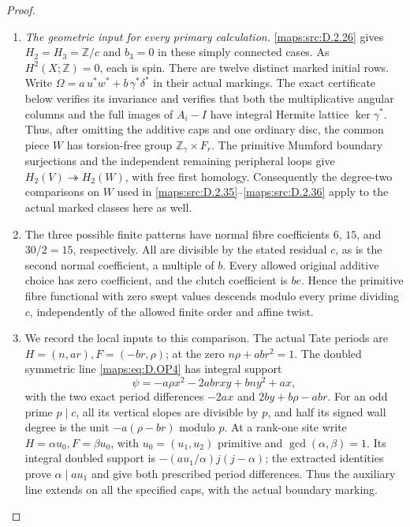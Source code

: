 \begin{proof}
\begin{enumerate}[label=\arabic*.,leftmargin=*]
\item \emph{The geometric input for every primary calculation.}
\ref{maps:src:D.2.26} gives $H_2=H_3=\mathbb Z/c$ and $b_3=0$ in these
simply connected cases. As $H^2(X;\mathbb Z)=0$, each is spin.
There are twelve distinct marked initial rows. Write
$\Omega=a\,u^*w^*+b\,\gamma^*\delta^*$ in their actual markings.
The exact certificate below verifies its invariance and verifies
that both the multiplicative angular columns and the full images
of $A_i-I$ have integral Hermite lattice $\ker\gamma^*$.
Thus, after omitting the additive caps and one ordinary disc,
the common piece $W$ has torsion-free group
$\mathbb Z_\gamma\times F_r$. The primitive Mumford boundary
surjections and the independent remaining peripheral loops give
$H_2(V)\twoheadrightarrow H_2(W)$, with free first homology.
Consequently the degree-two comparisons on $W$ used in
\ref{maps:src:D.2.35}--\ref{maps:src:D.2.36} apply to the actual marked classes here as well.

\item The three possible finite patterns have normal fibre coefficients
$6$, $15$, and $30/2=15$, respectively. All are divisible by
the stated residual $c$, as is the second normal coefficient,
a multiple of $b$. Every allowed original additive choice has
zero coefficient, and the clutch coefficient is $be$.
Hence the primitive fibre functional with zero swept values
descends modulo every prime dividing $c$, independently of
the allowed finite order and affine twist.

\item We record the local inputs to this comparison. The actual Tate
periods are $H=(n,ar),F=(-br,\rho)$; at the zero
$n\rho+ab r^2=1$. The doubled symmetric line \eqref{maps:eq:D.OP4} has
integral support
\[
          \psi=-a\rho x^2-2ab rxy+bn y^2+ax,
                                                        \tag{D.MT2}\label{maps:eq:D.MT2}
\]
with the two exact period differences $-2ax$ and
$2by+b\rho-ab r$. For an odd prime $p\mid c$, all its
vertical slopes are divisible by $p$, and half its signed
wall degree is the unit $-a(\rho-br)$ modulo $p$.
At a rank-one site write $H=\alpha u_0,F=\beta u_0$, with
$u_0=(u_1,u_2)$ primitive and $\gcd(\alpha,\beta)=1$.
Its integral doubled support is
$-(a u_1/\alpha)j(j-\alpha)$; the extracted identities prove
$\alpha\mid a u_1$ and give both prescribed period differences.
Thus the auxiliary line extends on all the specified caps,
with the actual boundary marking.


\end{enumerate}
\end{proof}
